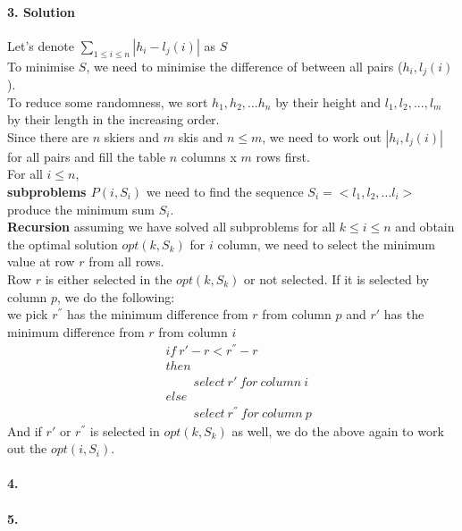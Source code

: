 \documentclass[a4paper]{scrartcl}
\begin{document}
\paragraph{3. Solution}
\label{sec:Question 3} Let's denote $\sum_{1\leq i \leq n} |h_i - l_j(i)|$ as $S$\\
 To minimise $S$, we need to minimise the difference of between all pairs ($h_i, l_j(i)$).\\
 To reduce some randomness, we sort $h_1,h_2,...h_n$ by their height and $l_1,l_2,...,l_m$ by their length in the increasing order.\\ 
 Since there are $n$ skiers and $m$ skis and $n\leq m$, we need to work out $|h_i, l_j(i)|$ for all pairs and fill the table $n$ columns x $m$ rows first. \\
 For all $i \leq n$,\\
 \textbf{subproblems $P(i, S_i)$} we need to find the sequence $S_i=\big<l_1,l_2,...l_i\big>$ produce the minimum sum $S_i$.\\
 \textbf{Recursion} assuming we have solved all subproblems for all $k \leq i \leq n$ and obtain the optimal solution $opt(k,S_{k})$
 for $i$ column, we need to select the minimum value at row $r$ from all rows.\\
 Row $r$ is either selected in the $opt(k,S_{k})$ or not selected.
 If it is selected by column $p$, we do the following:\\ 
 we pick  $r^{''}$ has the minimum difference from $r$ from column $p$ and $r'$ has the minimum difference from $r$ from column $i$
 \begin{align*} 
  &\ if\ r'-r <  r^{''} -r \\ 
  &\ then \\
  &\ \qquad\ select\ r'\ for\ column\ i\\
  &\ else \\
  &\ \qquad\ select\ r^{''}\ for\ column\ p
\end{align*}
And if $r'$ or $r^{''}$ is selected in $opt(k,S_{k})$ as well, we do the above again to work out the $opt(i,S_{i})$.
  \paragraph{4.}
\label{sec:Question 4}

\paragraph{5.}
\label{sec:Question 5}
\end{document}
